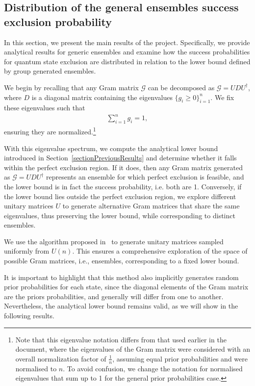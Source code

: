 \documentclass[12pt,letterpaper]{article}
\begin{document}
\subsection{Distribution of the general ensembles success exclusion probability}

\hspace{20pt}In this section, we present the main results of the project. Specifically, we provide analytical results for generic ensembles and examine how the success probabilities for quantum state exclusion are distributed in relation to the lower bound defined by group generated ensembles.

We begin by recalling that any Gram matrix $ \mathcal{G} $ can be decomposed as $ \mathcal{G} = U D U^\dagger $, where $ D $ is a diagonal matrix containing the eigenvalues $\{g_i\geq0\}_{i=1}^n $. We fix these eigenvalues such that
\begin{align*}
\sum_{i=1}^n g_i = 1,
\end{align*}
ensuring they are normalized.\footnote{Note that this eigenvalue notation differs from that used earlier in the document, where the eigenvalues of the Gram matrix were considered with an overall normalization factor of \( \frac{1}{n} \), assuming equal prior probabilities and were normalised to $n$. To avoid confusion, we change the notation for normalised eigenvalues that sum up to 1 for the general prior probabilities case.}

With this eigenvalue spectrum, we compute the analytical lower bound introduced in Section~\ref{sectionPreviousResults} and determine whether it falls within the perfect exclusion region. If it does, then any Gram matrix generated as $ \mathcal{G} = U D U^\dagger $ represents an ensemble for which perfect exclusion is feasible, and the lower bound is in fact the success probability, i.e. both are 1. Conversely, if the lower bound lies outside the perfect exclusion region, we explore different unitary matrices $ U $ to generate alternative Gram matrices that share the same eigenvalues, thus preserving the lower bound, while corresponding to distinct ensembles.

We use the algorithm proposed in~\cite{UnitaryMatricesGeneration} to generate unitary matrices sampled uniformly from \( U(n) \). This ensures a comprehensive exploration of the space of possible Gram matrices, i.e., ensembles, corresponding to a fixed lower bound.

It is important to highlight that this method also implicitly generates random prior probabilities for each state, since the diagonal elements of the Gram matrix are the priors probabilities, and generally will differ from one to another. Nevertheless, the analytical lower bound remains valid, as we will show in the following results.
\end{document}
